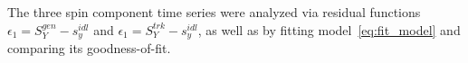 \documentclass[a4paper]{jacow}
\begin{document}

The three spin component time series were analyzed via residual functions
$\epsilon_1 = S_Y^{gen} - s_y^{idl}$ and $\epsilon_1 = S_Y^{trk} - s_y^{idl}$, as well as by fitting
model~\eqref{eq:fit_model} and comparing its goodness-of-fit.
\end{document}
